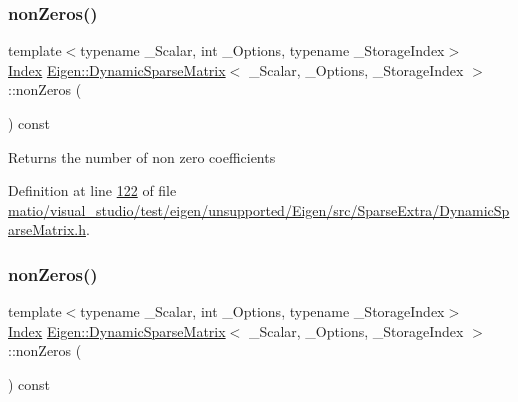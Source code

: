 \subsubsection{\texorpdfstring{non\+Zeros()}{nonZeros()}\hspace{0.1cm}{\footnotesize\ttfamily [1/2]}}
{\footnotesize\ttfamily template$<$typename \+\_\+\+Scalar, int \+\_\+\+Options, typename \+\_\+\+Storage\+Index$>$ \\
\hyperlink{group___core___module_a554f30542cc2316add4b1ea0a492ff02}{Index} \hyperlink{class_eigen_1_1_dynamic_sparse_matrix}{Eigen\+::\+Dynamic\+Sparse\+Matrix}$<$ \+\_\+\+Scalar, \+\_\+\+Options, \+\_\+\+Storage\+Index $>$\+::non\+Zeros (\begin{DoxyParamCaption}{ }\end{DoxyParamCaption}) const\hspace{0.3cm}{\ttfamily [inline]}}

\begin{DoxyReturn}{Returns}
the number of non zero coefficients 
\end{DoxyReturn}


Definition at line \hyperlink{matio_2visual__studio_2test_2eigen_2unsupported_2_eigen_2src_2_sparse_extra_2_dynamic_sparse_matrix_8h_source_l00122}{122} of file \hyperlink{matio_2visual__studio_2test_2eigen_2unsupported_2_eigen_2src_2_sparse_extra_2_dynamic_sparse_matrix_8h_source}{matio/visual\+\_\+studio/test/eigen/unsupported/\+Eigen/src/\+Sparse\+Extra/\+Dynamic\+Sparse\+Matrix.\+h}.

\mbox{\label{class_eigen_1_1_dynamic_sparse_matrix_a473cd00ddc0319327f4c8a6c82ec96cf}} 
\subsubsection{\texorpdfstring{non\+Zeros()}{nonZeros()}\hspace{0.1cm}{\footnotesize\ttfamily [2/2]}}
{\footnotesize\ttfamily template$<$typename \+\_\+\+Scalar, int \+\_\+\+Options, typename \+\_\+\+Storage\+Index$>$ \\
\hyperlink{group___core___module_a554f30542cc2316add4b1ea0a492ff02}{Index} \hyperlink{class_eigen_1_1_dynamic_sparse_matrix}{Eigen\+::\+Dynamic\+Sparse\+Matrix}$<$ \+\_\+\+Scalar, \+\_\+\+Options, \+\_\+\+Storage\+Index $>$\+::non\+Zeros (\begin{DoxyParamCaption}{ }\end{DoxyParamCaption}) const\hspace{0.3cm}{\ttfamily [inline]}}

